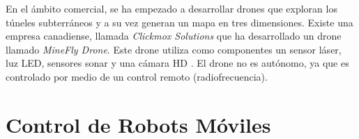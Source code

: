 
En el ámbito comercial, se ha empezado a desarrollar drones que exploran los túneles
subterráneos y a su vez generan un mapa en tres dimensiones. Existe una empresa canadiense,
llamada \textit{Clickmox Solutions} que ha desarrollado un drone llamado
\textit{MineFly Drone}. Este drone utiliza como componentes un sensor láser, luz LED,
sensores sonar y una cámara HD \cite{Solutions2016}. El drone no es autónomo, ya que es
controlado por medio de un control remoto (radiofrecuencia).


\section{Control de Robots Móviles}

